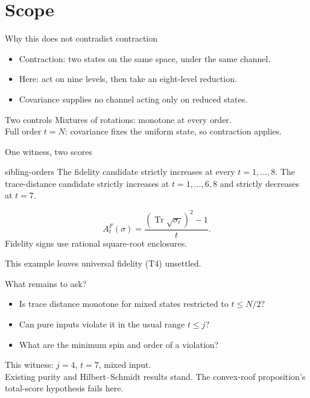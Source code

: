 \documentclass{beamer}
\begin{document}
\section{Scope}
\begin{frame}{Why this does not contradict contraction}
\begin{itemize}
\item Contraction: two states on the same space, under the same channel.
\item Here: act on nine levels, then take an eight-level reduction.
\item Covariance supplies no channel acting only on reduced states.
\end{itemize}
\begin{block}{Two controls}
Mixtures of rotations: monotone at every order.\\
Full order $t=N$: covariance fixes the uniform state, so contraction applies.
\end{block}
\end{frame}
\begin{frame}{One witness, two scores}
\begin{bookresult}{sibling-orders}
The fidelity candidate strictly increases at every $t=1,\ldots,8$. The trace-distance candidate strictly increases at $t=1,\ldots,6,8$ and strictly decreases at $t=7$.
\end{bookresult}
\[A_t^F(\sigma)=\frac{(\operatorname{Tr}\sqrt{\sigma_t})^2-1}{t}.\]
\small Fidelity signs use rational square-root enclosures.

This example leaves universal fidelity (T4) unsettled.
\end{frame}
\begin{frame}{What remains to ask?}
\begin{itemize}
\item Is trace distance monotone for mixed states restricted to $t\leq N/2$?
\item Can pure inputs violate it in the usual range $t\leq j$?
\item What are the minimum spin and order of a violation?
\end{itemize}
\medskip
This witness: $j=4$, $t=7$, mixed input.\\
\small Existing purity and Hilbert--Schmidt results stand. The convex-roof proposition's total-score hypothesis fails here.
\end{frame}
\appendix
\end{document}
